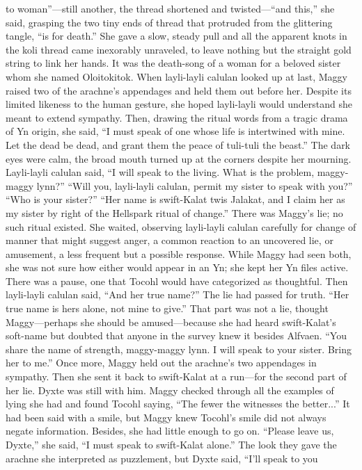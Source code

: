\documentclass[9pt]{article}
\begin{document}
to woman”—still another, the thread shortened and twisted—“and this,” she said, grasping the two tiny
ends of thread that protruded from the glittering tangle, “is for death.” She gave a slow, steady pull and all
the apparent knots in the koli thread came inexorably unraveled, to leave nothing but the straight gold
string to link her hands.
It was the death-song of a woman for a beloved sister whom she named Oloitokitok.
When layli-layli calulan looked up at last, Maggy raised two of the arachne’s appendages and held
them out before her. Despite its limited likeness to the human gesture, she hoped layli-layli would
understand she meant to extend sympathy. Then, drawing the ritual words from a tragic drama of Yn
origin, she said, “I must speak of one whose life is intertwined with mine. Let the dead be dead, and grant
them the peace of tuli-tuli the beast.”
The dark eyes were calm, the broad mouth turned up at the corners despite her mourning. Layli-layli
calulan said, “I will speak to the living. What is the problem, maggy-maggy lynn?”
“Will you, layli-layli calulan, permit my sister to speak with you?”
“Who is your sister?”
“Her name is swift-Kalat twis Jalakat, and I claim her as my sister by right of the Hellspark ritual of
change.” There was Maggy’s lie; no such ritual existed. She waited, observing layli-layli calulan
carefully for change of manner that might suggest anger, a common reaction to an uncovered lie, or
amusement, a less frequent but a possible response. While Maggy had seen both, she was not sure how
either would appear in an Yn; she kept her Yn files active.
There was a pause, one that Tocohl would have categorized as thoughtful. Then layli-layli calulan
said, “And her true name?”
The lie had passed for truth.
“Her true name is hers alone, not mine to give.” That part was not a lie, thought Maggy—perhaps she
should be amused—because she had heard swift-Kalat’s soft-name but doubted that anyone in the
survey knew it besides Alfvaen.
“You share the name of strength, maggy-maggy lynn. I will speak to your sister. Bring her to me.”
Once more, Maggy held out the arachne’s two appendages in sympathy. Then she sent it back to
swift-Kalat at a run—for the second part of her lie.
Dyxte was still with him. Maggy checked through all the examples of lying she had and found Tocohl
saying, “The fewer the witnesses the better...” It had been said with a smile, but Maggy knew Tocohl’s
smile did not always negate information. Besides, she had little enough to go on. “Please leave us,
Dyxte,” she said, “I must speak to swift-Kalat alone.”
The look they gave the arachne she interpreted as puzzlement, but Dyxte said, “I’ll speak to you
\end{document}
